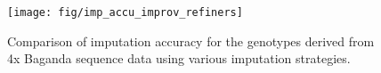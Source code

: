 \begin{figure}[htbp]
\centering
\texttt{[image: fig/imp\_accu\_improv\_refiners]}
\caption{Comparison of imputation accuracy for the genotypes derived from 4x Baganda sequence data using various imputation strategies.}
\label{fig:imp_accu_improv_refiners}
\end{figure}